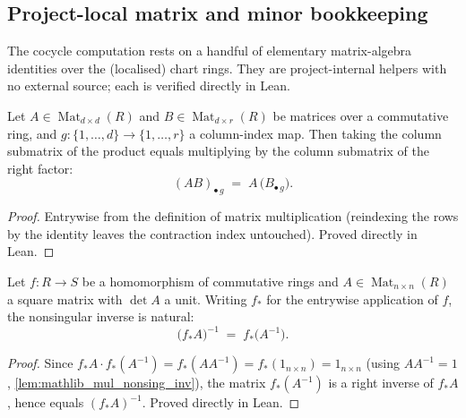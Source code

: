 \subsection*{Project-local matrix and minor bookkeeping}

The cocycle computation rests on a handful of elementary matrix-algebra
identities over the (localised) chart rings. They are project-internal helpers
with no external source; each is verified directly in Lean.

\begin{lemma}

  \label{lem:gr_mul_submatrix_col}
  Let \(A \in \operatorname{Mat}_{d\times d}(R)\) and
  \(B \in \operatorname{Mat}_{d\times r}(R)\) be matrices over a commutative ring,
  and \(g : \{1,\dots,d\} \to \{1,\dots,r\}\) a column-index map. Then taking the
  column submatrix of the product equals multiplying by the column submatrix of
  the right factor:
  \[
    (A B)_{\bullet\, g} \;=\; A \,\bigl(B_{\bullet\, g}\bigr).
  \]
\end{lemma}
\begin{proof}

\leanok
  Entrywise from the definition of matrix multiplication (reindexing the rows by
  the identity leaves the contraction index untouched). Proved directly in Lean.
\end{proof}

\begin{lemma}

  \label{lem:gr_map_nonsing_inv}
  Let \(f : R \to S\) be a homomorphism of commutative rings and
  \(A \in \operatorname{Mat}_{n\times n}(R)\) a square matrix with \(\det A\) a
  unit. Writing \(f_\ast\) for the entrywise application of \(f\), the
  nonsingular inverse is natural:
  \[
    \bigl(f_\ast A\bigr)^{-1} \;=\; f_\ast\bigl(A^{-1}\bigr).
  \]
\end{lemma}
\begin{proof}

\leanok
  Since \(f_\ast A \cdot f_\ast(A^{-1}) = f_\ast(A A^{-1}) = f_\ast(1_{n\times n})
  = 1_{n\times n}\) (using \(A A^{-1} = 1\), \cref{lem:mathlib_mul_nonsing_inv}),
  the matrix \(f_\ast(A^{-1})\) is a right inverse of \(f_\ast A\), hence equals
  \((f_\ast A)^{-1}\). Proved directly in Lean.
\end{proof}

